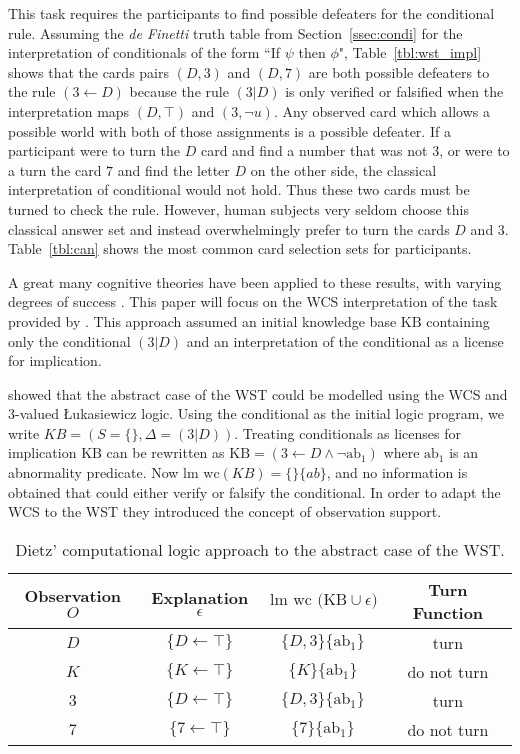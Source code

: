 This task requires the participants to find possible defeaters for the conditional rule. Assuming the \textit{de Finetti} truth table from Section~\ref{ssec:condi} for the interpretation of conditionals of the form ``If $\psi$ then $\phi$", Table~\ref{tbl:wst_impl} shows that the cards pairs $(D,3)$ and $(D,7)$ are both possible defeaters to the rule $(3 \leftarrow D)$ because the rule $(3|D)$ is only verified or falsified when the interpretation maps $(D,\top)$ and $(3, \lnot u)$. Any observed card which allows a possible world with both of those assignments is a possible defeater. If a participant were to turn the $D$ card and find a number that was not $3$, or were to a turn the card $7$ and find the letter $D$ on the other side, the classical interpretation of conditional would not hold. Thus these two cards must be turned to check the rule. However, human subjects very seldom choose this classical answer set and instead overwhelmingly prefer to turn the cards $D$ and $3$. Table~\ref{tbl:can} shows the most common card selection sets for participants.

A great many cognitive theories have been applied to these results, with varying degrees of success \citep{ragni2017formal}. This paper will focus on the WCS interpretation of the task provided by \cite{ragni2017wason}. This approach assumed an initial knowledge base $\text{KB}$ containing only the conditional $(3|D)$ and an interpretation of the conditional as a license for implication.

\cite{dietz2012computational} showed that the abstract case of the WST could be modelled using the WCS and 3-valued \L ukasiewicz logic. Using the conditional as the initial logic program, we write $KB=(S=\{\},\Delta=(3|D))$. Treating conditionals as licenses for implication $\text{KB}$ can be rewritten as $\text{KB}=(3\leftarrow D \land \lnot \text{ab}_1)$ where $\text{ab}_1$ is an abnormality predicate. Now $\textrm{lm wc}(KB)=\{\}\{ab\}$, and no information is obtained that could either verify or falsify the conditional. In order to adapt the WCS to the WST they introduced the concept of observation support.

\begin{table}
\begin{center}


\begin{tabular}{ c c c c }
  \textbf{Observation $O$}&  \textbf{Explanation $\epsilon$}&\textbf{$\text{lm wc (KB}\cup \epsilon)$}& \textbf{Turn Function} \\ 
  \hline
 $D$ & $\{D\leftarrow \top\}$ & $\{D,3\}\{\text{ab}_1\}$&turn\\  
 $K$ & $\{K\leftarrow \top\}$ & $\{K\}\{\text{ab}_1\}$&do not turn\\  
 $3$ & $\{D\leftarrow\top\}$ &$\{D,3\}\{\text{ab}_1\}$&turn\\
 $7$ & $\{7 \leftarrow \top\}$ & $\{7\}\{\text{ab}_1\}$&do not turn
\end{tabular}
\caption{Dietz' computational logic approach to the abstract case of the WST.}
\label{tbl:wst_lmwc}
\end{center}
\end{table}

